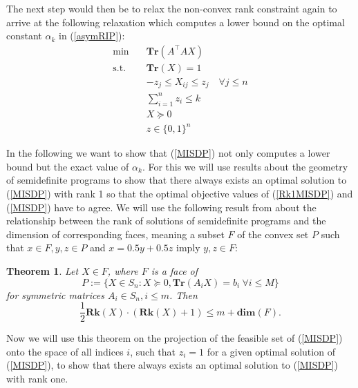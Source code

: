 \documentclass[a4paper,11pt,1p]{elsarticle}
\newtheorem{thm}{Theorem}
\newcommand{\T}{^{\top}}
\begin{document}
The next step would then be to relax the non-convex rank constraint again to arrive at the following relaxation which computes a lower bound on the optimal constant $\alpha_k$ in (\ref{asymRIP}):
\begin{align}\label{MISDP}
 \text{min} \quad & \textbf{Tr}(A\T A X) \nonumber \\
 \text{s.t.} \quad & \textbf{Tr}(X) = 1 \nonumber \\
 & -z_j \leq X_{ij} \leq z_j \quad \forall j \leq n \nonumber \\
 & \sum_{i=1}^n z_i \leq k \tag{MISDP} \\
 & X \succeq 0  \nonumber \\
 & z \in \{0,1\}^n \nonumber
\end{align}

In the following we want to show that (\ref{MISDP}) not only computes a lower bound but the exact value of $\alpha_k$. For this we will use results about the geometry of semidefinite programs to show that there always exists an 
optimal solution to (\ref{MISDP}) with rank 1 so that the optimal objective values of (\ref{Rk1MISDP}) and (\ref{MISDP}) have to agree. We will use the following result from \cite{pat98} about the relationship between the rank of
solutions of semidefinite programs and the dimension of corresponding faces, meaning a subset $F$ of the convex set $P$ such that $x \in F, y, z \in P$ and $x = 0.5y + 0.5z$ imply $y,z \in F$:

\begin{thm}\label{patakiLemma}
 Let $X \in F$, where $F$ is a face of
 \begin{equation*}
 P := \{X \in S_n : X \succeq 0, \textbf{Tr}(A_i X) = b_i \ \forall i \leq M\}
 \end{equation*}
 for symmetric matrices $A_i \in S_n, i \leq m$. Then
 \begin{equation*}
  \frac{1}{2}\textbf{Rk}(X)\cdot(\textbf{Rk}(X)+1) \leq m + \textbf{dim}(F).
 \end{equation*}
\end{thm}

Now we will use this theorem on the projection of the feasible set of (\ref{MISDP}) onto the space of all indices $i$, such that $z_i = 1$ for a given optimal solution of (\ref{MISDP}), to show that there always exists an optimal 
solution to (\ref{MISDP}) with rank one.
\end{document}
